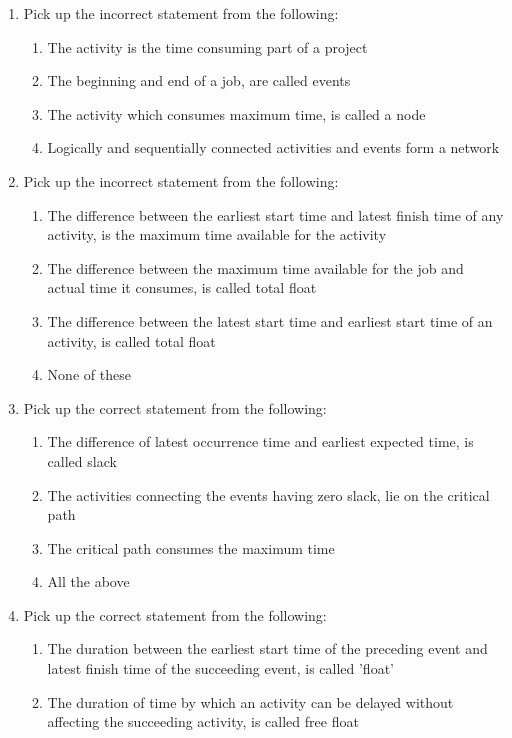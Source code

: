 \documentclass[11pt,a4paper]{article}
\begin{document}
\begin{enumerate}
\begin{enumerate}[label=\Alph*.]
\end{enumerate}
\item{Pick up the incorrect statement from the following:}
\begin{enumerate}[label=\Alph*.]
\item{The activity is the time consuming part of a project}
\item{The beginning and end of a job, are called events}
\item{The activity which consumes maximum time, is called a node}
\item{Logically and sequentially connected activities and events form a network}
\end{enumerate}
\item{Pick up the incorrect statement from the following:}
\begin{enumerate}[label=\Alph*.]
\item{The difference between the earliest start time and latest finish time of any activity, is the maximum time available for the activity}
\item{The difference between the maximum time available for the job and actual time it consumes, is called total float}
\item{The difference between the latest start time and earliest start time of an activity, is called total float}
\item{None of these}
\end{enumerate}
\item{Pick up the correct statement from the following:}
\begin{enumerate}[label=\Alph*.]
\item{The difference of latest occurrence time and earliest expected time, is called slack}
\item{The activities connecting the events having zero slack, lie on the critical path}
\item{The critical path consumes the maximum time}
\item{All the above}
\end{enumerate}
\item{Pick up the correct statement from the following:}
\begin{enumerate}[label=\Alph*.]
\item{The duration between the earliest start time of the preceding event and latest finish time of the succeeding event, is called 'float'}
\item{The duration of time by which an activity can be delayed without affecting the succeeding activity, is called free float}

\end{enumerate}
\end{enumerate}
\end{document}

